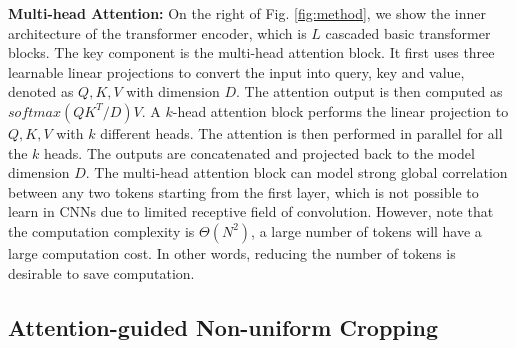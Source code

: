 \documentclass[10pt,twocolumn,letterpaper]{article}
\begin{document}
\textbf{Multi-head Attention:} On the right of Fig. \ref{fig:method}, we show the inner architecture of the transformer encoder, which is $L$ cascaded basic transformer blocks. The key component is the multi-head attention block. It first uses three learnable linear projections to convert the input into query, key and value, denoted as $Q, K, V$ with dimension $D$. The attention output is then computed as $softmax(QK^{T}/D)V$. A $k$-head attention block performs the linear projection to $Q, K, V$ with $k$ different heads. The attention is then performed in parallel for all the $k$ heads. The outputs are concatenated and projected back to the model dimension $D$. The multi-head attention block can model strong global correlation between any two tokens starting from the first layer, which is not possible to learn in CNNs due to limited receptive field of convolution. However, note that the computation complexity is $\Theta(N^{2})$, a large number of tokens will have a large computation cost. In other words, reducing the number of tokens is desirable to save computation. 

\subsection{Attention-guided Non-uniform Cropping}
\label{sec:crop}
\end{document}

